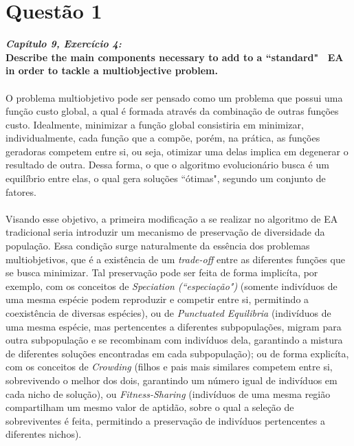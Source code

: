 \documentclass{report}
\begin{document}
\section*{Questão 1}

\textbf{\textit{Capítulo 9, Exercício 4:}}\\

\textbf{Describe the main components necessary to add to a ``standard" \ EA in order to tackle a multiobjective problem.}\\

\paragraph{} O problema multiobjetivo pode ser pensado como um problema que possui uma função custo global, a qual é formada através da combinação de outras funções custo. Idealmente, minimizar a função global consistiria em minimizar, individualmente, cada função que a compõe, porém, na prática, as funções geradoras competem entre si, ou seja, otimizar uma delas implica em degenerar o resultado de outra. Dessa forma, o que o algoritmo evolucionário busca é um equilíbrio entre elas, o qual gera soluções ``ótimas", segundo um conjunto de fatores.\\ 

\paragraph{} Visando esse objetivo, a primeira modificação a se realizar no algoritmo de EA tradicional seria introduzir um mecanismo de preservação de diversidade da população. Essa condição surge naturalmente da essência dos problemas multiobjetivos, que é a existência de um \textit{trade-off} entre as diferentes funções que se busca minimizar. Tal preservação pode ser feita de forma implicíta, por exemplo, com os conceitos de \textit{Speciation (``especiação")} (somente indivíduos de uma mesma espécie podem reproduzir e competir entre si, permitindo a coexistência de diversas espécies), ou de \textit{Punctuated Equilibria} (indivíduos de uma mesma espécie, mas pertencentes a diferentes subpopulações, migram para outra subpopulação e se recombinam com indivíduos dela, garantindo a mistura de diferentes soluções encontradas em cada subpopulação); ou de forma explicíta, com os conceitos de \textit{Crowding} (filhos e pais mais similares competem entre si, sobrevivendo o melhor dos dois, garantindo um número igual de indivíduos em cada nicho de solução), ou \textit{Fitness-Sharing} (indivíduos de uma mesma região compartilham um mesmo valor de aptidão, sobre o qual a seleção de sobreviventes é feita, permitindo a preservação de indivíduos pertencentes a diferentes nichos).\\
\end{document}
